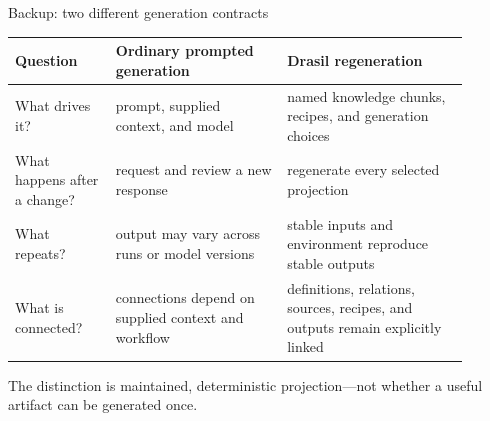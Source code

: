 \documentclass[aspectratio=169,10pt]{beamer}
\newcommand{\claim}[1]{%
  \begin{center}
    \setlength{\fboxsep}{7pt}%
    \colorbox{drasilblue!9}{\parbox{0.88\linewidth}{\centering #1}}%
  \end{center}
}
\begin{document}
\begin{frame}{Backup: two different generation contracts}
\small
\renewcommand{\arraystretch}{1.22}
\begin{tabular}{>{\raggedright\arraybackslash}p{0.20\linewidth}
                >{\raggedright\arraybackslash}p{0.34\linewidth}
                >{\raggedright\arraybackslash}p{0.36\linewidth}}
\toprule
\textbf{Question} & \textbf{Ordinary prompted generation} & \textbf{Drasil regeneration}\\
\midrule
What drives it? & prompt, supplied context, and model & named knowledge chunks, recipes, and generation choices\\[0.3em]
What happens after a change? & request and review a new response & regenerate every selected projection\\[0.3em]
What repeats? & output may vary across runs or model versions & stable inputs and environment reproduce stable outputs\\[0.3em]
What is connected? & connections depend on supplied context and workflow & definitions, relations, sources, recipes, and outputs remain explicitly linked\\
\bottomrule
\end{tabular}
\vspace{0.45em}
\claim{The distinction is maintained, deterministic projection---not whether a useful artifact can be generated once.}
\end{frame}
\end{document}
